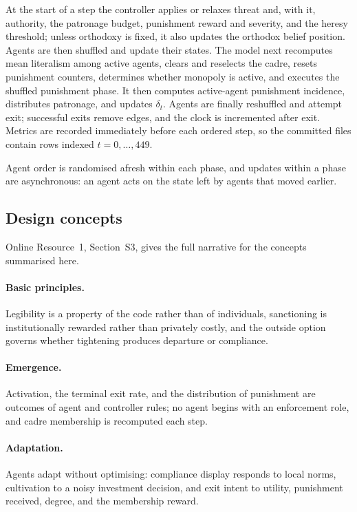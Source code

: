 \documentclass[12pt]{article}
\begin{document}
At the start of a step the controller applies or relaxes threat and, with it,
authority, the patronage budget, punishment reward and severity, and the heresy
threshold; unless orthodoxy is fixed, it also updates the orthodox belief
position. Agents are then shuffled and update their states. The model
next recomputes mean literalism among active agents, clears and reselects the
cadre, resets punishment counters, determines whether monopoly is active, and
executes the shuffled punishment phase. It then computes active-agent punishment
incidence, distributes patronage, and updates \(\delta_t\). Agents are finally
reshuffled and attempt exit; successful exits remove edges, and the clock is
incremented after exit. Metrics are recorded
immediately before each ordered step, so the committed files contain rows
indexed \(t=0,\ldots,449\).

Agent order is randomised afresh within each phase, and updates within a phase
are asynchronous: an agent acts on the state left by agents that moved earlier.

\subsection{Design concepts}

Online Resource~1, Section~S3, gives the full narrative for the concepts
summarised here.

\paragraph{Basic principles.} Legibility is a property of the code rather than
of individuals, sanctioning is institutionally rewarded rather than privately
costly, and the outside option governs whether tightening produces departure or
compliance.

\paragraph{Emergence.} Activation, the terminal exit rate, and the distribution
of punishment are outcomes of agent and controller rules; no agent begins with
an enforcement role, and cadre membership is recomputed each step.

\paragraph{Adaptation.} Agents adapt without optimising: compliance display
responds to local norms, cultivation to a noisy investment decision, and exit
intent to utility, punishment received, degree, and the membership reward.
\end{document}
